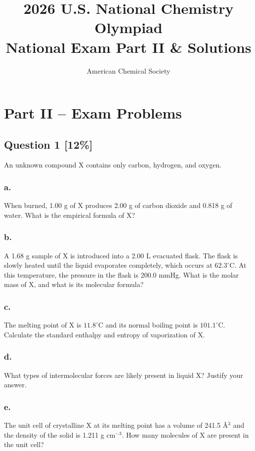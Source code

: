 \documentclass[11pt,letterpaper]{article}
\title{2026 U.S. National Chemistry Olympiad\\National Exam Part II \& Solutions}
\author{American Chemical Society}
\date{}
\begin{document}
\maketitle

\section*{Part II -- Exam Problems}

\subsection*{Question 1 [12\%]}
An unknown compound X contains only carbon, hydrogen, and oxygen.

\subsubsection*{a.}
When burned, 1.00 g of X produces 2.00 g of carbon dioxide and 0.818 g of water. What is the empirical formula of X?
\vspace{4cm}

\subsubsection*{b.}
A 1.68 g sample of X is introduced into a 2.00 L evacuated flask. The flask is slowly heated until the liquid evaporates completely, which occurs at $62.3^{\circ}\text{C}$. At this temperature, the pressure in the flask is 200.0 mmHg. What is the molar mass of X, and what is its molecular formula?
\vspace{4cm}

\subsubsection*{c.}
The melting point of X is $11.8^{\circ}\text{C}$ and its normal boiling point is $101.1^{\circ}\text{C}$. Calculate the standard enthalpy and entropy of vaporization of X.
\vspace{4cm}

\newpage
\subsubsection*{d.}
What types of intermolecular forces are likely present in liquid X? Justify your answer.
\vspace{4cm}

\subsubsection*{e.}
The unit cell of crystalline X at its melting point has a volume of 241.5 \AA$^3$ and the density of the solid is 1.211 g $\text{cm}^{-3}$. How many molecules of X are present in the unit cell?
\vspace{4cm}
\end{document}
